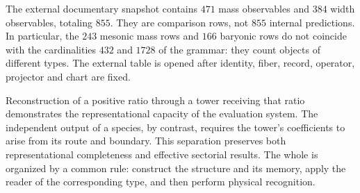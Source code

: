 The external documentary snapshot contains \(471\) mass observables and
\(384\) width observables, totaling \(855\). They are comparison rows, not
\(855\) internal predictions. In particular, the \(243\) mesonic mass
rows and \(166\) baryonic rows do not coincide with the cardinalities
\(432\) and \(1728\) of the grammar: they count objects of different types.
The external table is opened after identity, fiber, record,
operator, projector and chart are fixed.

Reconstruction of a positive ratio through a tower receiving that
ratio demonstrates the representational capacity of the evaluation system.
The independent output of a species, by contrast, requires the tower's
coefficients to arise from its route and boundary. This
separation preserves both representational completeness and effective
sectorial results. The whole is organized by a
common rule: construct the structure and its memory, apply the reader
of the corresponding type, and then perform physical recognition.
